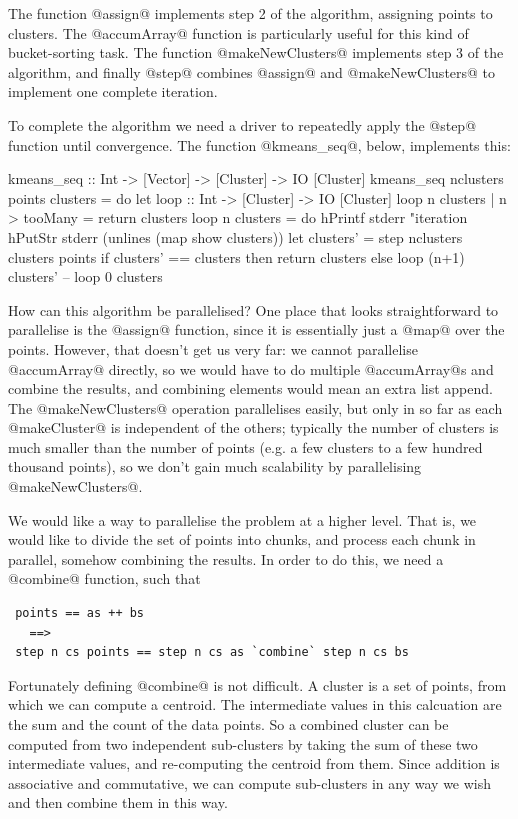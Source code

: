 The function @assign@ implements step 2 of the algorithm, assigning
points to clusters.  The @accumArray@ function is particularly useful
for this kind of bucket-sorting task.  The function @makeNewClusters@
implements step 3 of the algorithm, and finally @step@ combines
@assign@ and @makeNewClusters@ to implement one complete iteration.

To complete the algorithm we need a driver to repeatedly apply the
@step@ function until convergence.  The function @kmeans_seq@, below,
implements this:

\begin{haskell}
kmeans_seq :: Int -> [Vector] -> [Cluster] -> IO [Cluster]
kmeans_seq nclusters points clusters = do
  let
      loop :: Int -> [Cluster] -> IO [Cluster]
      loop n clusters | n > tooMany = return clusters
      loop n clusters = do
        hPrintf stderr "iteration %
        hPutStr stderr (unlines (map show clusters))
        let clusters' = step nclusters clusters points
        if clusters' == clusters
           then return clusters
           else loop (n+1) clusters'
  --
  loop 0 clusters
\end{haskell}

How can this algorithm be parallelised?  One place that looks
straightforward to parallelise is the @assign@ function, since it is
essentially just a @map@ over the points.  However, that doesn't get
us very far: we cannot parallelise @accumArray@ directly, so we would
have to do multiple @accumArray@s and combine the results, and
combining elements would mean an extra list append.  The
@makeNewClusters@ operation parallelises easily, but only in so far as
each @makeCluster@ is independent of the others; typically the number
of clusters is much smaller than the number of points (e.g. a few
clusters to a few hundred thousand points), so we don't gain much
scalability by parallelising @makeNewClusters@.

We would like a way to parallelise the problem at a higher level.
That is, we would like to divide the set of points into chunks, and
process each chunk in parallel, somehow combining the results.  In
order to do this, we need a @combine@ function, such that

{\small \begin{verbatim}
 points == as ++ bs
   ==>
 step n cs points == step n cs as `combine` step n cs bs
\end{verbatim}}

Fortunately defining @combine@ is not difficult.  A cluster is a set
of points, from which we can compute a centroid.  The intermediate
values in this calcuation are the sum and the count of the data
points.  So a combined cluster can be computed from two independent
sub-clusters by taking the sum of these two intermediate values, and
re-computing the centroid from them.  Since addition is associative
and commutative, we can compute sub-clusters in any way we wish and
then combine them in this way.


